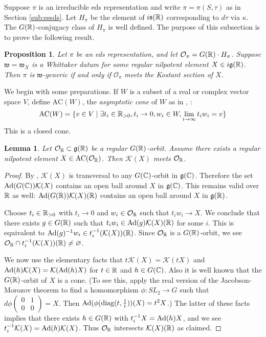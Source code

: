 \documentclass{article}
\newtheorem{lem}[thm]{Lemma}
\newtheorem{pro}[thm]{Proposition}
\theoremstyle{definition}
\numberwithin{equation}{section}
\renewcommand{\-}{\hyp{}}
\newcommand{\s}{\mathfrak s}
\newcommand{\g}{\mathfrak g}
\renewcommand{\O}{\mathcal O}
\newcommand{\K}{\mathcal K}
\newcommand{\w}{\mathfrak w}
\newcommand{\AC}{\mathrm{AC}}
\begin{document}
Suppose $\pi$ is an irreducible eds representation and write $\pi=\pi(S,\tau)$ as in Section  \ref{sub:essds}. Let $H_\pi$ be the element of $i\s(\R)$ corresponding to $d\tau$ via $\kappa$. The $G(\mathbb{R})$-conjugacy class of $H_\pi$ is well defined. The purpose of this subsection is to prove the following result.

	

\begin{pro}
  \label{p:whittaker}
Let $\pi$ be an eds representation,
and let $\O_\pi=G(\R)\cdot H_\pi$.
Suppose $\w=\w_X$ is a Whittaker datum for some regular nilpotent element $X\in i\g(\R)$.
Then $\pi$ is $\w$-generic if and only if $\O_\pi$ meets the Kostant section of $X$.
\end{pro}

We begin with some preparations. If $W$ is a subset of a real or complex vector space $V$, define  $\AC(W)$,  the  {\it asymptotic cone} of $W$ as in   \cite[Proposition 3.7]{bvlocal}, \cite[Definition 2.9]{avav}:
$$
\AC(W)=\{v\in V\mid \exists t_i\in \R_{>0},t_i\rightarrow 0,w_i\in W,\lim_{i\rightarrow\infty}t_i w_i=v\}
$$
This is a closed cone. 

\begin{lem} \label{lem:g1}
Let $\O_\R\subset \g(\R)$ be a regular $G(\mathbb{R})$-orbit. Assume there exists a regular nilpotent element $X\in\AC(\O_\R)$. Then $\K(X)$ meets $\O_\R$.
\end{lem}

\begin{proof}
By \cite{Kos63}, $\K(X)$ is transversal to any $G(\mathbb{C})$-orbit in $\g(\C)$. Therefore the set $\tx{Ad}(G(\C))\K(X)$ contains an open ball around $X$ in $\g(\C)$. This remains valid over $\mathbb{R}$ as well: $\tx{Ad}(G(\R))\K(X)(\R)$ contains an open ball around $X$ in $\g(\R)$.

Choose $t_i \in \mathbb{R}_{>0}$ with $t_i \to 0$ and $w_i \in \O_\R$ such that $t_iw_i \to X$. We conclude that there exists $g \in G(\mathbb{R})$ such that $t_iw_i \in \tx{Ad}(g)\K(X)(\R)$ for some $i$. This is equivalent to $\tx{Ad}(g)^{-1}w_i \in t_i^{-1}(\K(X))(\R)$. Since $\O_\R$ is a $G(\mathbb{R})$-orbit, we see $\O_\R \cap t_i^{-1}(\K(X))(\R) \neq \varnothing$. 

We now use the elementary facts that $t\K(X)=\K(tX)$ and $\tx{Ad}(h)\K(X)=\K(\tx{Ad}(h)X)$ for $t \in \mathbb{R}$ and $h \in G(\mathbb{C})$.
Also it is well known that the $G(\mathbb{R})$-orbit of $X$ is a cone. (To see this, apply the real version of the Jacobson-Morozov theorem
\cite[Theorem 9.2.1]{CM} to  find a homomorphism $\phi:SL_2\rightarrow G$ such that $d\phi\begin{pmatrix}0&1\\0&0\end{pmatrix}=X$.
Then $\textrm{Ad}(\phi(\mathrm{diag}(t,\frac 1t))(X)=t^2X$.)
The latter of these facts implies that there exists $h \in G(\mathbb{R})$ with $t_i^{-1}X=\textrm{Ad}(h)X$, and we see $t_i^{-1}\K(X)=\tx{Ad}(h)\K(X)$. Thus $\O_\R$ intersects $\K(X)(\R)$ as claimed.
\end{proof}
\end{document}

